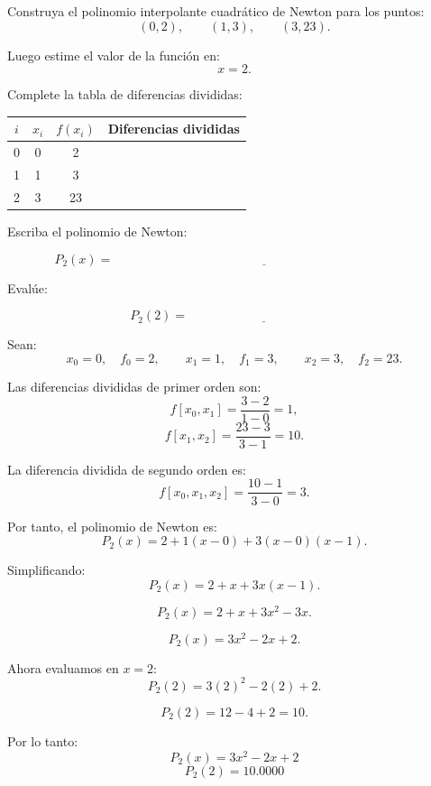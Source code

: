 \documentclass[11pt,respuestas,a4]{aleph-examen}
\begin{document}
\begin{preguntas}

\item
Construya el polinomio interpolante cuadrático de Newton para los puntos: 
\[
(0,2),\qquad (1,3),\qquad (3,23).
\]

Luego estime el valor de la función en:
\[
x=2.
\]

Complete la tabla de diferencias divididas:

\begin{center}
\renewcommand{\arraystretch}{1.5}
\begin{tabular}{c|c|c|c}
\toprule
$i$ & $x_i$ & $f(x_i)$ & Diferencias divididas \\
\midrule
0 & 0 & 2 &  \\
1 & 1 & 3 &  \\
2 & 3 & 23 &  \\
\bottomrule
\end{tabular}
\end{center}

Escriba el polinomio de Newton:

\[
P_2(x)=\underline{\hspace{10cm}}
\]

Evalúe:

\[
P_2(2)=\underline{\hspace{5cm}}
\]

\begin{respuesta}
Sean:
\[
x_0=0,\quad f_0=2,
\qquad
x_1=1,\quad f_1=3,
\qquad
x_2=3,\quad f_2=23.
\]

Las diferencias divididas de primer orden son:
\[
f[x_0,x_1]=\frac{3-2}{1-0}=1,
\]
\[
f[x_1,x_2]=\frac{23-3}{3-1}=10.
\]

La diferencia dividida de segundo orden es:
\[
f[x_0,x_1,x_2]=\frac{10-1}{3-0}=3.
\]

Por tanto, el polinomio de Newton es:
\[
P_2(x)=2+1(x-0)+3(x-0)(x-1).
\]

Simplificando:
\[
P_2(x)=2+x+3x(x-1).
\]

\[
P_2(x)=2+x+3x^2-3x.
\]

\[
P_2(x)=3x^2-2x+2.
\]

Ahora evaluamos en $x=2$:
\[
P_2(2)=3(2)^2-2(2)+2.
\]

\[
P_2(2)=12-4+2=10.
\]

Por lo tanto:
\[
\boxed{P_2(x)=3x^2-2x+2}
\]
\[
\boxed{P_2(2)=10.0000}
\]
\end{respuesta}


\end{preguntas}
\end{document}
